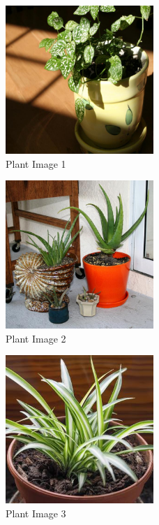 \begin{figure}[h]
   \centering
   \includegraphics[width=0.5\textwidth]{../test-pictures/plant/plant1.jpg}
   \caption{Plant Image 1}
   \label{fig:Plant1}
\end{figure}

\begin{figure}[h]
   \centering
   \includegraphics[width=0.5\textwidth]{../test-pictures/plant/plant2.jpg}
   \caption{Plant Image 2}
   \label{fig:Plant2}
\end{figure}

\begin{figure}[h]
   \centering
   \includegraphics[width=0.5\textwidth]{../test-pictures/plant/plant3.jpg}
   \caption{Plant Image 3}
   \label{fig:Plant3}
\end{figure}

